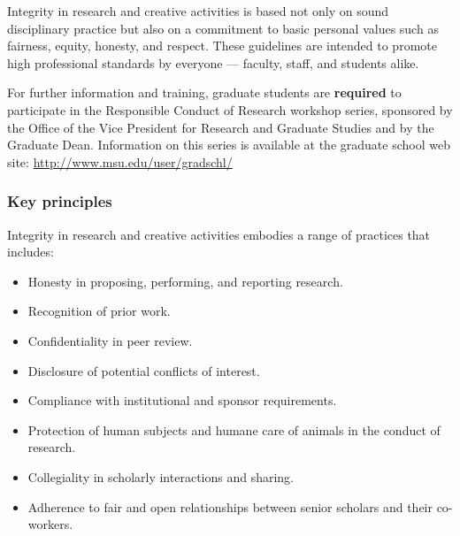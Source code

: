 Integrity in research and creative activities is based not only on
sound disciplinary practice but also on a commitment to basic personal
values such as fairness, equity, honesty, and respect. These
guidelines are intended to promote high professional standards by
everyone — faculty, staff, and students alike.
  
For further information and training, graduate students are \textbf{required}
to participate in the Responsible Conduct of Research workshop series,
sponsored by the Office of the Vice President for Research and
Graduate Studies and by the Graduate Dean. Information on this series
is available at the graduate school web site:
\url{http://www.msu.edu/user/gradschl/}

\subsubsection{Key principles}

Integrity in research and creative activities embodies a range of practices that includes: 

\begin{itemize}
\item Honesty in proposing, performing, and reporting research. 

\item Recognition of prior work. 

\item Confidentiality in peer review. 

\item Disclosure of potential conflicts of interest. 

\item Compliance with institutional and sponsor requirements. 

\item Protection of human subjects and humane care of animals in the
  conduct of research. 

\item Collegiality in scholarly interactions and sharing.  

\item Adherence to fair and open relationships between senior
scholars and their co-workers. 

\end{itemize}

